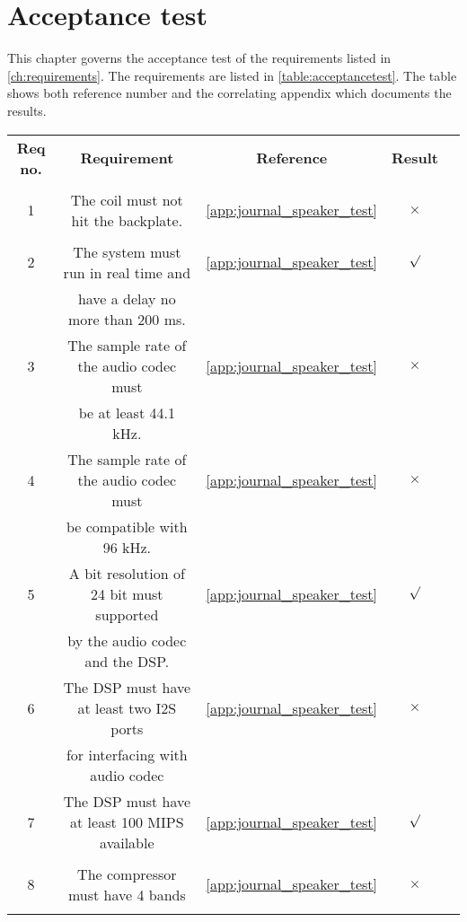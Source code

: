 \chapter{Acceptance test}

This chapter governs the acceptance test of the requirements listed in \autoref{ch:requirements}. The requirements are listed in \autoref{table:acceptancetest}. The table shows both reference number and the correlating appendix which documents the results.  



\renewcommand{\arraystretch}{0.95}
\begin{table}[H]
\centering
\begin{tabular}{|c|c|c|c|c|} \hline
\rowcolor{lightgray} \bfseries Req no. 	& \bfseries Requirement 						&  \bfseries Reference				&\bfseries Result 	\\ 
\rowcolor{lightgray}					&												&  									&		 			\\ \hline

1			& The coil must not hit the backplate. 			& \autoref{app:journal_speaker_test} 	&	$\times$ 		\\ 
 			&												& 										&	 				\\ \hline
%
2			& The system must run in real time and 			& \autoref{app:journal_speaker_test}	& 	$\surd$			\\ 
			& have a delay no more than 200 ms.				& 										&					\\ \hline
%
3			& The sample rate of the audio codec must 		& \autoref{app:journal_speaker_test}	&	$\times$		\\ 
			& be at least 44.1 kHz. 						& 										&					\\ \hline
%
4			& The sample rate of the audio codec must   	& \autoref{app:journal_speaker_test}	& 	$\times$		\\ 
			& be compatible with 96 kHz.					&										&					\\ \hline

5			&  A bit resolution of 24 bit must supported 	& \autoref{app:journal_speaker_test}	&	$\surd$			\\ 
			&  by the audio codec and the DSP. 	 	 		&						 				&					\\ \hline
%
6			& The DSP must have at least two I2S ports 		& \autoref{app:journal_speaker_test}	&	$\times$		\\ 
			& for interfacing with audio codec  			& 			 					 		&					\\ \hline
%
7			& The DSP must have at least 100 MIPS available	& \autoref{app:journal_speaker_test}	&	$\surd$			\\ 
			&										  	 	&						 				&					\\ \hline
%
8			& The compressor must have 4 bands 				& \autoref{app:journal_speaker_test}	&	$\times$		\\ 
			& 												& 			 					 		&					\\ \hline


\end{tabular}
\end{table}
